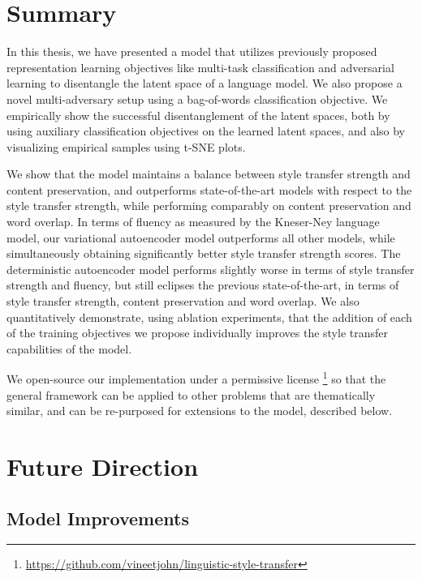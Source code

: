 \section{Summary}

In this thesis, we have presented a model that utilizes previously proposed representation learning objectives like multi-task classification and adversarial learning to disentangle the latent space of a language model. We also propose a novel multi-adversary setup using a bag-of-words classification objective. We empirically show the successful disentanglement of the latent spaces, both by using auxiliary classification objectives on the learned latent spaces, and also by visualizing empirical samples using t-SNE plots.

We show that the model maintains a balance between style transfer strength and content preservation, and outperforms state-of-the-art models with respect to the style transfer strength, while performing comparably on content preservation and word overlap. In terms of fluency as measured by the Kneser-Ney language model, our variational autoencoder model outperforms all other models, while simultaneously obtaining significantly better style transfer strength scores. The deterministic autoencoder model performs slightly worse in terms of style transfer strength and fluency, but still eclipses the previous state-of-the-art, in terms of style transfer strength, content preservation and word overlap. We also quantitatively demonstrate, using ablation experiments, that the addition of each of the training objectives we propose individually improves the style transfer capabilities of the model.

We open-source our implementation under a permissive license \footnote{\url{https://github.com/vineetjohn/linguistic-style-transfer}} so that the general framework can be applied to other problems that are thematically similar, and can be re-purposed for extensions to the model, described below.


\section{Future Direction}

\subsection{Model Improvements}

